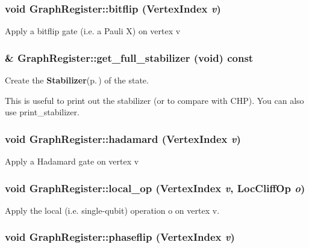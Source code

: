 \subsubsection{\setlength{\rightskip}{0pt plus 5cm}void Graph\-Register::bitflip ({\bf Vertex\-Index} {\em v})\hspace{0.3cm}{\tt  [inline]}}\label{classGraphRegister_a6}


Apply a bitflip gate (i.e. a Pauli X) on vertex v 
\subsubsection{ \& Graph\-Register::get\_\-full\_\-stabilizer (void) const}\label{classGraphRegister_a11}


Create the {\bf Stabilizer}{\rm (p.\,\pageref{structStabilizer})} of the state. 

This is useful to print out the stabilizer (or to compare with CHP). You can also use print\_\-stabilizer. 
\subsubsection{\setlength{\rightskip}{0pt plus 5cm}void Graph\-Register::hadamard ({\bf Vertex\-Index} {\em v})\hspace{0.3cm}{\tt  [inline]}}\label{classGraphRegister_a4}


Apply a Hadamard gate on vertex v 
\subsubsection{\setlength{\rightskip}{0pt plus 5cm}void Graph\-Register::local\_\-op ({\bf Vertex\-Index} {\em v}, {\bf Loc\-Cliff\-Op} {\em o})\hspace{0.3cm}{\tt  [inline]}}\label{classGraphRegister_a3}


Apply the local (i.e. single-qubit) operation o on vertex v. 
\subsubsection{\setlength{\rightskip}{0pt plus 5cm}void Graph\-Register::phaseflip ({\bf Vertex\-Index} {\em v})\hspace{0.3cm}{\tt  [inline]}}\label{classGraphRegister_a7}


